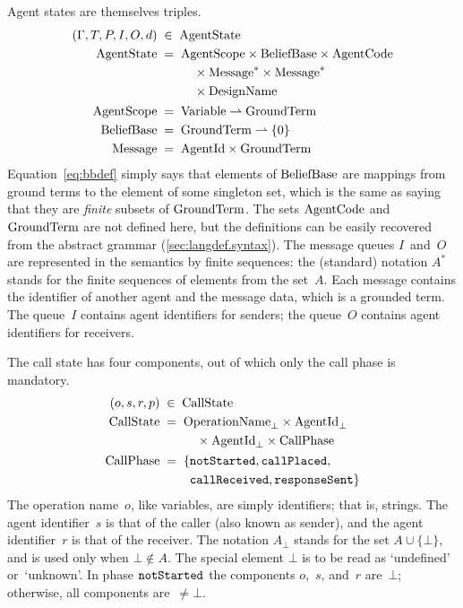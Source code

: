 \documentclass[a4paper,12pt,oneside,fleqn]{book} %
\newcommand{\pmap}{\rightharpoonup}
\begin{document}
Agent states are themselves triples.
\begin{align}
(\Gamma, T, P, I, O,d) &\;\in\; {\rm AgentState}
\\
{\rm AgentState} &\;=\;
  \begin{aligned}[t]
    &{\rm AgentScope} \times{\rm BeliefBase} \times{\rm AgentCode} \\
    &\quad\times{\rm Message}^* \times{\rm Message}^* \\
    &\quad\times{\rm DesignName}
  \end{aligned}
\\
{\rm AgentScope} &\;=\; {\rm Variable}\pmap{\rm GroundTerm}
\\
{\rm BeliefBase} &\;=\; {\rm GroundTerm}\pmap\{0\} \label{eq:bbdef}
\\
{\rm Message} &\;=\; {\rm AgentId}\times{\rm GroundTerm}
\end{align}
Equation~\eqref{eq:bbdef} simply says that elements of ${\rm BeliefBase}$
are mappings from ground terms to the element of some singleton set, which
is the same as saying that they are \emph{finite} subsets of ${\rm
GroundTerm}$. The sets ${\rm AgentCode}$ and ${\rm GroundTerm}$ are not
defined here, but the definitions can be easily recovered from the abstract
grammar (\autoref{sec:langdef.syntax}). The message queues $I$~and~$O$ are
represented in the semantics by finite sequences: the (standard) notation
$A^*$ stands for the finite sequences of elements from the set~$A$. Each
message contains the identifier of another agent and the message data,
which is a grounded term. The queue~$I$ contains agent identifiers for
senders; the queue~$O$ contains agent identifiers for receivers.

The call state has four components, out of which only the call phase is
mandatory.
\begin{align}
(o,s,r,p) &\;\in\; {\rm CallState}
\\
{\rm CallState} &\;=\;
  \begin{aligned}[t]
  &{\rm OperationName}_\bot\times{\rm AgentId}_\bot \\
  &\quad\times{\rm AgentId}_\bot\times{\rm CallPhase}
  \end{aligned}
\\
{\rm CallPhase} &\;=\;
  \begin{aligned}[t]
  \{  &{\tt notStarted}, {\tt callPlaced},\\
      &{\tt callReceived}, {\tt responseSent} \}
  \end{aligned}
\end{align}
The operation name~$o$, like variables, are simply identifiers; that is,
strings. The agent identifier~$s$ is that of the caller (also known as
sender), and the agent identifier~$r$ is that of the receiver. The notation
$A_\bot$ stands for the set $A\cup\{\bot\}$, and is used only when
$\bot\notin A$. The special element $\bot$ is to be read as `undefined'
or~`unknown'. In phase ${\tt notStarted}$ the components $o$,~$s$, and~$r$
are~$\bot$; otherwise, all components are~$\ne\bot$.
\end{document}
